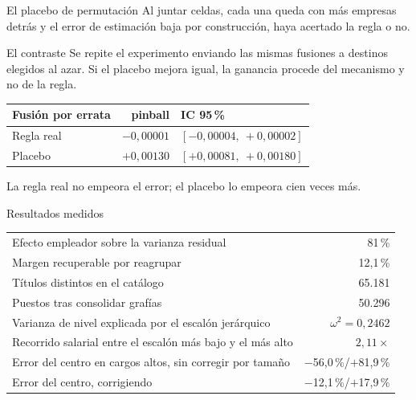 \documentclass[11pt]{beamer}
\begin{document}
\begin{frame}{El placebo de permutación}
Al juntar celdas, cada una queda con más empresas detrás y el error de estimación
baja \alert{por construcción}, haya acertado la regla o no.
\medskip
\begin{block}{El contraste}
Se repite el experimento enviando las mismas fusiones a destinos elegidos
\alert{al azar}. Si el placebo mejora igual, la ganancia procede del mecanismo y
no de la regla.
\end{block}
\medskip
\begin{table}
\centering
\small
\begin{tabular}{lrl}
\toprule
Fusión por errata & pinball & IC 95\,\% \\
\midrule
Regla real & $-0{,}00001$ & $[-0{,}00004,\ +0{,}00002]$ \\
Placebo & \alert{$+0{,}00130$} & $[+0{,}00081,\ +0{,}00180]$ \\
\bottomrule
\end{tabular}
\end{table}
La regla real no empeora el error; el placebo lo empeora cien veces más.
\end{frame}

\begin{frame}{Resultados medidos}
\begin{table}
\centering
\small
\begin{tabular}{lr}
\toprule
Efecto empleador sobre la varianza residual & 81\,\% \\
Margen recuperable por reagrupar & 12,1\,\% \\
\midrule
Títulos distintos en el catálogo & 65.181 \\
Puestos tras consolidar grafías & \alert{50.296} \\
\midrule
Varianza de nivel explicada por el escalón jerárquico & $\omega^2 = 0{,}2462$ \\
Recorrido salarial entre el escalón más bajo y el más alto & $2{,}11\times$ \\
\midrule
Error del centro en cargos altos, sin corregir por tamaño &
$-$56,0\,\%/$+$81,9\,\% \\
Error del centro, corrigiendo & \alert{$-$12,1\,\%/$+$17,9\,\%} \\
\bottomrule
\end{tabular}
\end{table}
\end{frame}
\end{document}
